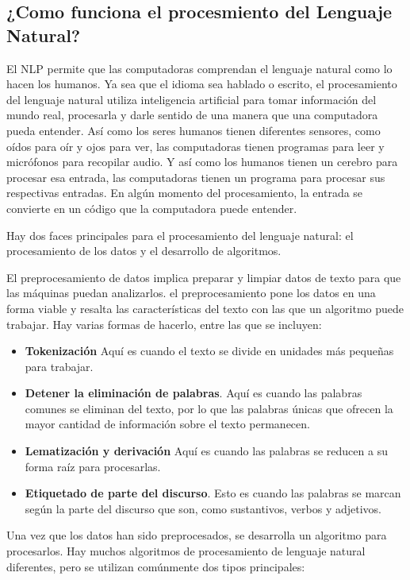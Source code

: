 \documentclass{llncs}
\begin{document}
	\subsection{¿Como funciona el procesmiento del Lenguaje Natural?} 
	El NLP permite que las computadoras comprendan el lenguaje natural como lo hacen los humanos. Ya sea que el idioma sea hablado o escrito, el procesamiento del lenguaje natural utiliza inteligencia artificial para tomar información del mundo real, procesarla y darle sentido de una manera que una computadora pueda entender. Así como los seres humanos tienen diferentes sensores, como oídos para oír y ojos para ver, las computadoras tienen programas para leer y micrófonos para recopilar audio. Y así como los humanos tienen un cerebro para procesar esa entrada, las computadoras tienen un programa para procesar sus respectivas entradas. En algún momento del procesamiento, la entrada se convierte en un código que la computadora puede entender. 
	
	Hay dos faces principales para el procesamiento del lenguaje natural: el procesamiento de los datos y el desarrollo de algoritmos. 
	
	El preprocesamiento de datos implica preparar y limpiar datos de texto para que las máquinas puedan analizarlos. el preprocesamiento pone los datos en una forma viable y resalta las características del texto con las que un algoritmo puede trabajar. Hay varias formas de hacerlo, entre las que se incluyen: 
	\begin{itemize}
		\item \textbf{Tokenización } Aquí es cuando el texto se divide en unidades más pequeñas para trabajar. 
		\item \textbf{Detener la eliminación de palabras}.  Aquí es cuando las palabras comunes se eliminan del texto, por lo que las palabras únicas que ofrecen la mayor cantidad de información sobre el texto permanecen. 
		\item \textbf{Lematización y derivación} Aquí es cuando las palabras se reducen a su forma raíz para procesarlas. 
		\item \textbf{Etiquetado de parte del discurso}.  Esto es cuando las palabras se marcan según la parte del discurso que son, como sustantivos, verbos y adjetivos.
	\end{itemize}
	
	Una vez que los datos han sido preprocesados, se desarrolla un algoritmo para procesarlos. Hay muchos algoritmos de procesamiento de lenguaje natural diferentes, pero se utilizan comúnmente dos tipos principales: 
	
\end{document}
